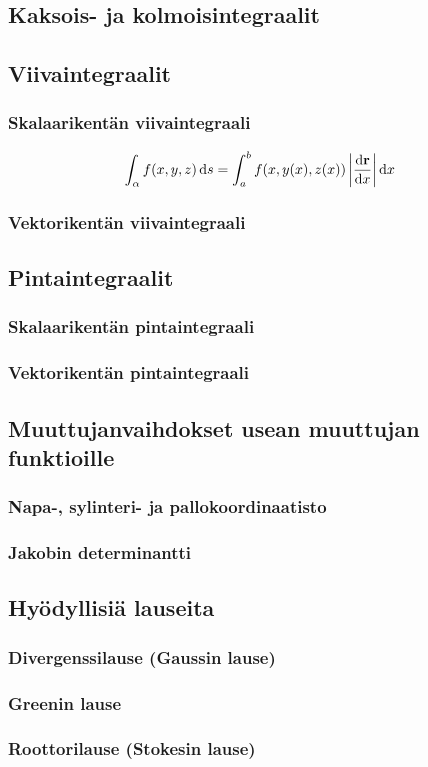 \documentclass[../integrointiopas.tex]{subfiles}
\begin{document}
	\subsection{Kaksois- ja kolmoisintegraalit}
	
	\subsection{Viivaintegraalit}
	
	\subsubsection{Skalaarikentän viivaintegraali}
	
	\begin{equation}
		\int_{\alpha}f(x,y,z)\odif{s} = \int_{a}^{b}f(x, y(x), z(x))\left|\odv{\vtr{r}}{x}\right|\odif{x}
	\end{equation}
	
	\subsubsection{Vektorikentän viivaintegraali}
	
	\subsection{Pintaintegraalit}
	
	\subsubsection{Skalaarikentän pintaintegraali}
	
	\subsubsection{Vektorikentän pintaintegraali}
	
	\subsection{Muuttujanvaihdokset usean muuttujan funktioille}
	
	\subsubsection{Napa-, sylinteri- ja pallokoordinaatisto}
	
	\subsubsection{Jakobin determinantti}
	
	\subsection{Hyödyllisiä lauseita}
	
	\subsubsection{Divergenssilause (Gaussin lause)}
	
	\subsubsection{Greenin lause}
	
	\subsubsection{Roottorilause (Stokesin lause)}
\end{document}
